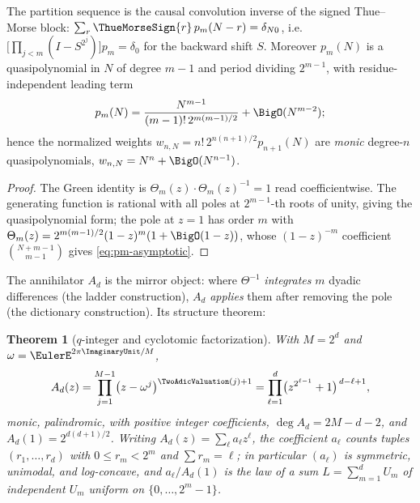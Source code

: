 \documentclass[11pt,oneside]{article}
\numberwithin{equation}{section}
\newtheorem{theorem}{Theorem}[section]
\theoremstyle{definition}
\theoremstyle{remark}
\newcommand{\ThetaTM}{\Theta}
\begin{document}
\begin{proposition}
\label{prop:tm-green}
The partition sequence is the causal convolution inverse of the
signed Thue--Morse block:
$\sum_{r}\ThueMorseSign{r}\,p_m(N-r)=\delta_{N0}$, i.e.\
$\bigl[\prod_{j<m}(I-S^{2^{j}})\bigr]p_m=\delta_0$ for the backward
shift $S$.  Moreover $p_m(N)$ is a quasipolynomial in $N$ of degree
$m-1$ and period dividing $2^{m-1}$, with residue-independent leading
term
\begin{equation}
 p_m(N)=\frac{N^{m-1}}{(m-1)!\,2^{m(m-1)/2}}+\BigO(N^{m-2});
 \label{eq:pm-asymptotic}
\end{equation}
hence the normalized weights $w_{n,N}=n!\,2^{n(n+1)/2}p_{n+1}(N)$ are
\emph{monic} degree-$n$ quasipolynomials, $w_{n,N}=N^{n}+\BigO(N^{n-1})$.
\end{proposition}

\begin{proof}
The Green identity is
$\ThetaTM_m(z)\cdot\ThetaTM_m(z)^{-1}=1$ read coefficientwise.  The
generating function is rational with all poles at $2^{m-1}$-th roots
of unity, giving the quasipolynomial form; the pole at $z=1$ has
order $m$ with
$\ThetaTM_m(z)=2^{m(m-1)/2}(1-z)^{m}(1+\BigO(1-z))$, whose
$(1-z)^{-m}$ coefficient $\binom{N+m-1}{m-1}$ gives
\eqref{eq:pm-asymptotic}.
\end{proof}

The annihilator $A_d$ is the mirror object: where
$\ThetaTM^{-1}$ \emph{integrates} $m$ dyadic differences (the ladder
construction), $A_d$ \emph{applies} them after removing the pole
(the dictionary construction).  Its structure theorem:

\begin{theorem}[$q$-integer and cyclotomic factorization]
\label{thm:A-factor}
With $M=2^{d}$ and $\omega=\EulerE^{2\pi\ImaginaryUnit/M}$,
\begin{equation}
 A_d(z)=\prod_{j=1}^{M-1}\bigl(z-\omega^{j}\bigr)^{\TwoAdicValuation(j)+1}
 =\prod_{\ell=1}^{d}\bigl(z^{2^{\ell-1}}+1\bigr)^{\,d-\ell+1},
 \label{eq:A-cyclotomic}
\end{equation}
monic, palindromic, with positive integer coefficients,
$\deg A_d=2M-d-2$, and $A_d(1)=2^{d(d+1)/2}$.  Writing
$A_d(z)=\sum_\ell a_\ell z^{\ell}$, the coefficient $a_\ell$ counts
tuples $(r_1,\dots,r_d)$ with $0\le r_m<2^{m}$ and $\sum r_m=\ell$;
in particular $(a_\ell)$ is symmetric, unimodal, and log-concave, and
$a_\ell/A_d(1)$ is the law of a sum
$L=\sum_{m=1}^{d}U_m$ of independent $U_m$ uniform on
$\{0,\dots,2^{m}-1\}$.
\end{theorem}
\end{document}
